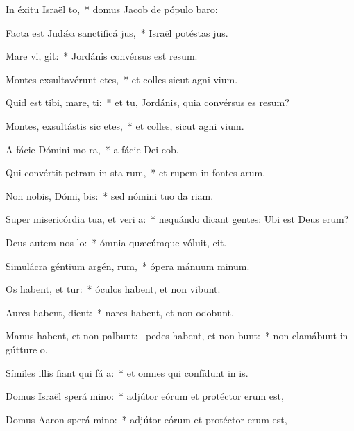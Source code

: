 \item In éxitu Israël  to,~* domus Jacob de pópulo baro:
\item Facta est Judǽa sanctificá jus,~* Israël potéstas jus.
\item Mare vi,  git:~* Jordánis convérsus est resum.
\item Montes exsultavérunt  etes,~* et colles sicut agni vium.
\item Quid est tibi, mare,  ti:~* et tu, Jordánis, quia convérsus es resum?
\item Montes, exsultástis sic etes,~* et colles, sicut agni vium.
\item A fácie Dómini mo  ra,~* a fácie Dei cob.
\item Qui convértit petram in sta rum,~* et rupem in fontes arum.
\item Non nobis, Dómi,  bis:~* sed nómini tuo da riam.
\item Super misericórdia tua, et veri a:~* nequándo dicant gentes: Ubi est Deus erum?
\item Deus autem nos  lo:~* ómnia quæcúmque vóluit, cit.
\item Simulácra géntium argén,  rum,~* ópera mánuum minum.
\item Os habent, et  tur:~* óculos habent, et non vibunt.
\item Aures habent,   dient:~* nares habent, et non odobunt.
\item Manus habent, et non palbunt:~\pscross{} pedes habent, et non bunt:~* non clamábunt in gútture o.
\item Símiles illis fiant qui fá a:~* et omnes qui confídunt in is.
\item Domus Israël sperá  mino:~* adjútor eórum et protéctor erum est,
\item Domus Aaron sperá  mino:~* adjútor eórum et protéctor erum est,
